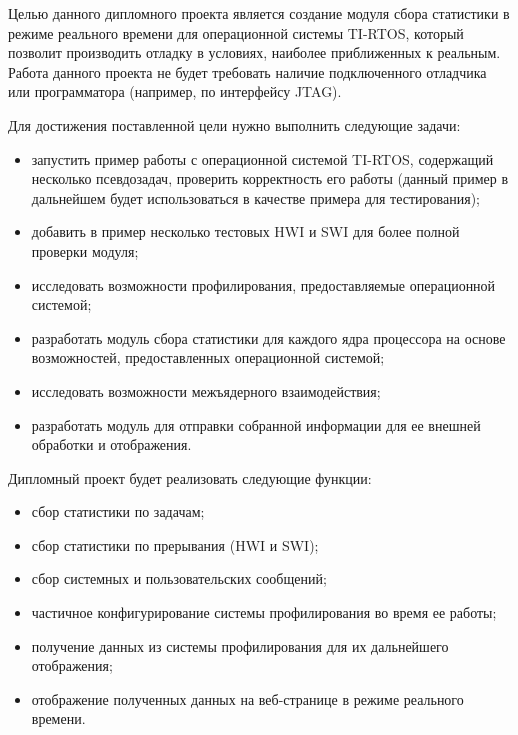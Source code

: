 
Целью данного дипломного проекта является создание модуля сбора статистики
в режиме реального времени для операционной системы TI-RTOS, который позволит
производить отладку в условиях, наиболее приближенных к реальным.
Работа данного проекта не будет требовать наличие подключенного отладчика
или программатора (например, по интерфейсу JTAG).


Для достижения поставленной цели нужно выполнить следующие задачи:
\begin{itemize}
    \item запустить пример работы с операционной системой TI-RTOS, содержащий несколько псевдозадач, проверить корректность его работы (данный пример в дальнейшем будет использоваться в качестве примера для тестирования);
    \item добавить в пример несколько тестовых HWI и SWI для более полной проверки модуля;
    \item исследовать возможности профилирования, предоставляемые операционной системой;
    \item разработать модуль сбора статистики для каждого ядра процессора на основе возможностей, предоставленных операционной системой;
    \item исследовать возможности межъядерного взаимодействия;
    \item разработать модуль для отправки собранной информации для ее внешней обработки и отображения.
\end{itemize}

Дипломный проект будет реализовать следующие функции:
\begin{itemize}
    \item сбор статистики по задачам;
    \item сбор статистики по прерывания (HWI и SWI);
    \item сбор системных и пользовательских сообщений;
    \item частичное конфигурирование системы профилирования во время ее работы;
    \item получение данных из системы профилирования для их дальнейшего отображения;
    \item отображение полученных данных на веб-странице в режиме реального времени.
\end{itemize}

